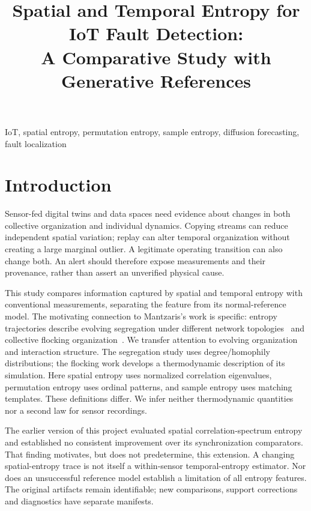 \documentclass[conference]{IEEEtran}
\title{Spatial and Temporal Entropy for IoT Fault Detection:\\A Comparative Study with Generative References}
\author{\IEEEauthorblockN{Alexander V. Mantzaris and James H. Korris}}
\begin{document}
\maketitle
\begin{abstract}

\end{abstract}
\begin{IEEEkeywords}
IoT, spatial entropy, permutation entropy, sample entropy, diffusion forecasting, fault localization
\end{IEEEkeywords}

\section{Introduction}
Sensor-fed digital twins and data spaces need evidence about changes in both
collective organization and individual dynamics. Copying streams can reduce
independent spatial variation; replay can alter temporal organization without
creating a large marginal outlier. A legitimate operating transition can also
change both. An alert should therefore expose measurements and their provenance,
rather than assert an unverified physical cause.

This study compares information captured by spatial and temporal entropy with
conventional measurements, separating the feature from its normal-reference
model. The motivating connection to Mantzaris's work is specific: entropy
trajectories describe evolving segregation under different network
topologies~\cite{mantzaris2024} and collective flocking
organization~\cite{mantzaris2025}. We transfer attention to evolving organization
and interaction structure. The segregation study uses degree/homophily
distributions; the flocking work develops a thermodynamic description of its
simulation. Here spatial entropy uses normalized correlation eigenvalues,
permutation entropy uses ordinal patterns, and sample entropy uses matching
templates. These definitions differ. We infer neither thermodynamic quantities
nor a second law for sensor recordings.

The earlier version of this project evaluated spatial correlation-spectrum
entropy and established no consistent improvement over its synchronization
comparators. That finding motivates, but does not predetermine, this extension.
A changing spatial-entropy trace is not itself a within-sensor temporal-entropy
estimator. Nor does an unsuccessful reference model establish a limitation of
all entropy features. The original artifacts remain identifiable; new
comparisons, support corrections and diagnostics have separate manifests.
\end{document}

